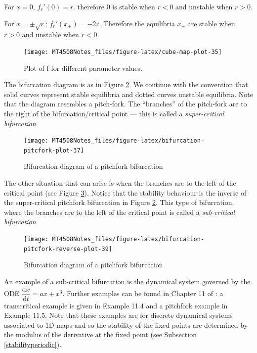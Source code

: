 \documentclass[
  a4paper,
  oneside,
  final]{krantz}
\renewcommand{\d}{\mathrm{d}}
\newcommand{\der}[2]{\dfrac{\d #1}{\d #2}}
\theoremstyle{definition}
\theoremstyle{definition}
\theoremstyle{definition}
\theoremstyle{definition}
\theoremstyle{remark}
\begin{document}
For \(x = 0\), \(f_{r}'(0) = r\). therefore \(0\) is stable when \(r<0\) and
unstable when \(r>0\).

For \(x = \pm \sqrt{r}\); \(f_{r}'(x_{\pm}) = -2r\). Therefore the
equilibria \(x_{\pm}\) are stable when \(r>0\) and unstable when \(r<0\).

\begin{figure}

{\centering \texttt{[image: MT4508Notes\_files/figure-latex/cube-map-plot-35]} 

}

\caption{Plot of f for different parameter values.}\label{fig:cube-map-plot}
\end{figure}

The bifurcation diagram is as in Figure
\ref{fig:bifurcation-pitcfork-plot}. We continue with the convention
that solid curves represent stable equilibria and dotted curves unstable
equilibria. Note that the diagram resembles a pitch-fork. The ``branches''
of the pitch-fork are to the right of the bifurcation/critical point ---
this is called a \emph{super-critical bifurcation}.

\begin{figure}

{\centering \texttt{[image: MT4508Notes\_files/figure-latex/bifurcation-pitcfork-plot-37]} 

}

\caption{Bifurcation diagram of a pitchfork bifurcation}\label{fig:bifurcation-pitcfork-plot}
\end{figure}

The other situation that can arise is when the branches are to the left
of the critical point (see Figure
\ref{fig:bifurcation-pitcfork-reverse-plot}). Notice that the stability
behaviour is the inverse of the super-critical pitchfork bifurcation in
Figure \ref{fig:bifurcation-pitcfork-plot}. This type of bifurcation,
where the branches are to the left of the critical point is called a
\emph{sub-critical bifurcation}.

\begin{figure}

{\centering \texttt{[image: MT4508Notes\_files/figure-latex/bifurcation-pitcfork-reverse-plot-39]} 

}

\caption{Bifurcation diagram of a pitchfork bifurcation}\label{fig:bifurcation-pitcfork-reverse-plot}
\end{figure}

An example of a sub-critical bifurcation is the dynamical system
governed by the ODE \(\der{x}{t} = ax + x^3\). Further examples can be
found in Chapter 11 of \citep{ASY}: a transcritical example is given in
Example 11.4 and a pitchfork example in Example 11.5. Note that these
examples are for discrete dynamical systems associated to 1D maps and so
the stability of the fixed points are determined by the modulus of the
derivative at the fixed point (see Subsection \ref{stabilityperiodic}).
\end{document}
